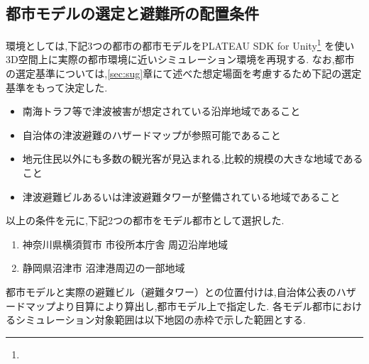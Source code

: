 \subsection{都市モデルの選定と避難所の配置条件}
環境としては,下記3つの都市の都市モデルをPLATEAU SDK for Unity\footnote{
}
を使い3D空間上に実際の都市環境に近いシミュレーション環境を再現する.
なお,都市の選定基準については,\ref{sec:sug}章にて述べた想定場面を考慮するため下記の選定基準をもって決定した.
\begin{itemize}
  \item 南海トラフ等で津波被害が想定されている沿岸地域であること
  \item 自治体の津波避難のハザードマップが参照可能であること
  \item 地元住民以外にも多数の観光客が見込まれる,比較的規模の大きな地域であること
  \item 津波避難ビルあるいは津波避難タワーが整備されている地域であること
\end{itemize}
以上の条件を元に,下記2つの都市をモデル都市として選択した.
\begin{enumerate}
  \item 神奈川県横須賀市 市役所本庁舎 周辺沿岸地域
  \item 静岡県沼津市 沼津港周辺の一部地域
\end{enumerate}
都市モデルと実際の避難ビル（避難タワー）との位置付けは,自治体公表のハザードマップより目算により算出し,都市モデル上で指定した.
各モデル都市におけるシミュレーション対象範囲は以下地図の赤枠で示した範囲とする.

